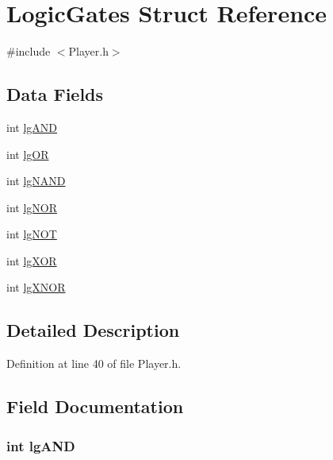 \hypertarget{struct_logic_gates}{\section{Logic\-Gates Struct Reference}
\label{struct_logic_gates}
}


{\ttfamily \#include $<$Player.\-h$>$}

\subsection*{Data Fields}
\begin{DoxyCompactItemize}
\item 
int \hyperlink{struct_logic_gates_a6ab16cd4023d1c9693f48b01ba0c7986}{lg\-A\-N\-D}
\item 
int \hyperlink{struct_logic_gates_acf4b5c34b226849120c5e2251246c8cf}{lg\-O\-R}
\item 
int \hyperlink{struct_logic_gates_a2d08e833a1ea8655875e4ffac0ab07d3}{lg\-N\-A\-N\-D}
\item 
int \hyperlink{struct_logic_gates_aecc18d1d55579d8aebafc7b06447c18d}{lg\-N\-O\-R}
\item 
int \hyperlink{struct_logic_gates_a6cab9b7b339ebd11b190fcf3d7a9d4d4}{lg\-N\-O\-T}
\item 
int \hyperlink{struct_logic_gates_a5c54f5251d91f4d8b7ba09a9ed1c1cc3}{lg\-X\-O\-R}
\item 
int \hyperlink{struct_logic_gates_a945acef637980ca1476ddb6d12343b72}{lg\-X\-N\-O\-R}
\end{DoxyCompactItemize}


\subsection{Detailed Description}


Definition at line 40 of file Player.\-h.



\subsection{Field Documentation}
\hypertarget{struct_logic_gates_a6ab16cd4023d1c9693f48b01ba0c7986}{
\subsubsection[{lg\-A\-N\-D}]{\setlength{\rightskip}{0pt plus 5cm}int lg\-A\-N\-D}}\label{struct_logic_gates_a6ab16cd4023d1c9693f48b01ba0c7986}


